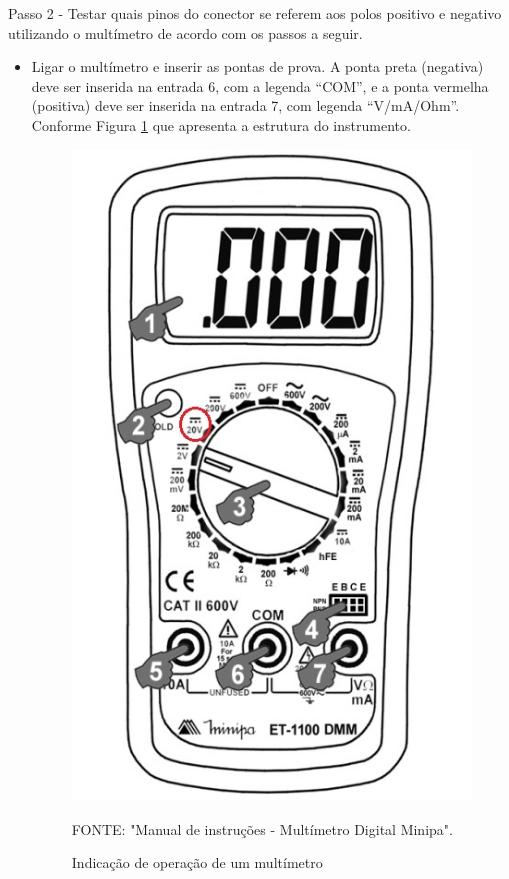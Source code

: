 Passo 2 - Testar quais pinos do conector se referem aos polos positivo e negativo utilizando o multímetro de acordo com os passos a seguir.

\begin{itemize}
    \item Ligar o multímetro e inserir as pontas de prova. A ponta preta (negativa) deve ser inserida na entrada 6, com a legenda “COM”, e a ponta vermelha (positiva) deve ser inserida na entrada 7, com legenda “V/mA/Ohm”. Conforme Figura \ref{fig:multimetro}  que apresenta a estrutura do instrumento.

\begin{figure}[H]
  \centering
  \includegraphics[keepaspectratio=true,scale=0.6] {Figuras/MALETA/energiamaleta/multimetro.jpg}
  \caption{Indicação de operação de um multímetro} 
 { \footnotesize FONTE: "Manual de instruções - Multímetro Digital Minipa".} 
  \label{fig:multimetro}
\end{figure}


\end{itemize}
